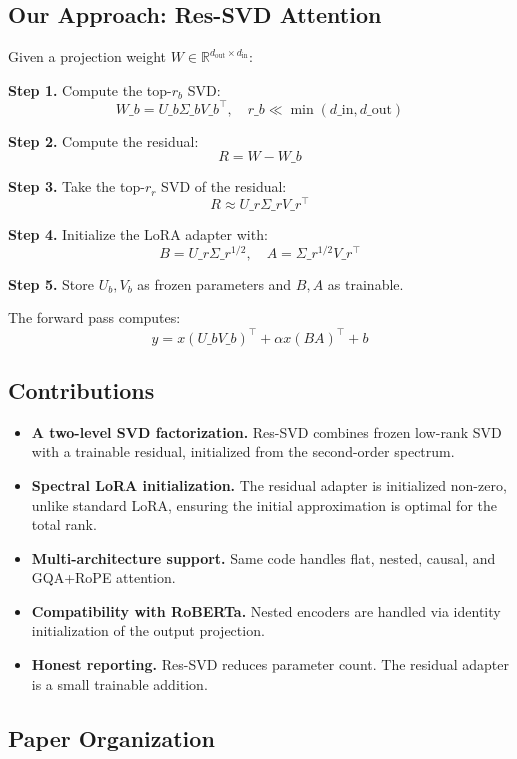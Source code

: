 \subsection{Our Approach: Res-SVD Attention}

Given a projection weight $W \in \mathbb{R}^{d_\text{out} \times d_\text{in}}$:

\textbf{Step 1.} Compute the top-$r_b$ SVD:
\[
W\_b = U\_b \Sigma\_b V\_b^\top, \quad r\_b \ll \min(d\_\text{in}, d\_\text{out})
\tag{1.2}
\]

\textbf{Step 2.} Compute the residual:
\[
R = W - W\_b
\tag{1.3}
\]

\textbf{Step 3.} Take the top-$r_r$ SVD of the residual:
\[
R \approx U\_r \Sigma\_r V\_r^\top
\tag{1.4}
\]

\textbf{Step 4.} Initialize the LoRA adapter with:
\[
B = U\_r \Sigma\_r^{1/2}, \quad A = \Sigma\_r^{1/2} V\_r^\top
\tag{1.5}
\]

\textbf{Step 5.} Store $U_b, V_b$ as frozen parameters and $B, A$ as trainable.

The forward pass computes:
\[
y = x (U\_b V\_b)^\top + \alpha x (B A)^\top + b
\tag{1.6}
\]

\subsection{Contributions}

\begin{itemize}
\item \textbf{A two-level SVD factorization.} Res-SVD combines frozen low-rank SVD
  with a trainable residual, initialized from the second-order spectrum.
\item \textbf{Spectral LoRA initialization.} The residual adapter is initialized
  non-zero, unlike standard LoRA, ensuring the initial approximation is
  optimal for the total rank.
\item \textbf{Multi-architecture support.} Same code handles flat, nested, causal,
  and GQA+RoPE attention.
\item \textbf{Compatibility with RoBERTa.} Nested encoders are handled via
  identity initialization of the output projection.
\item \textbf{Honest reporting.} Res-SVD reduces parameter count. The residual
  adapter is a small trainable addition.

\end{itemize}
\subsection{Paper Organization}

